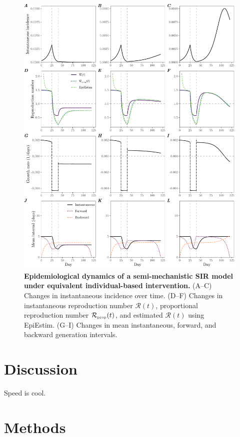 \documentclass[12pt]{article}
\newcommand{\RR}{\ensuremath{{\mathcal R}}\xspace}
\newcommand{\tsub}[2]{#1_{{\textrm{\tiny #2}}}}
\begin{document}
\begin{figure}
\includegraphics[width=\textwidth]{figure_sir_semi.pdf}
\caption{
\textbf{Epidemiological dynamics of a semi-mechanistic SIR model under equivalent individual-based intervention.}
(A--C) Changes in instantaneous incidence over time.
(D--F) Changes in instantaneous reproduction number $\RR(t)$, proportional reproduction number $\tsub{\RR}{prop}(t)$, and estimated $\RR(t)$ using EpiEstim.
(G--I) Changes in mean instantaneous, forward, and backward generation intervals.
}
\label{fig:sir_semi}
\end{figure}

\section{Discussion}

Speed is cool.

\section{Methods}
\end{document}
